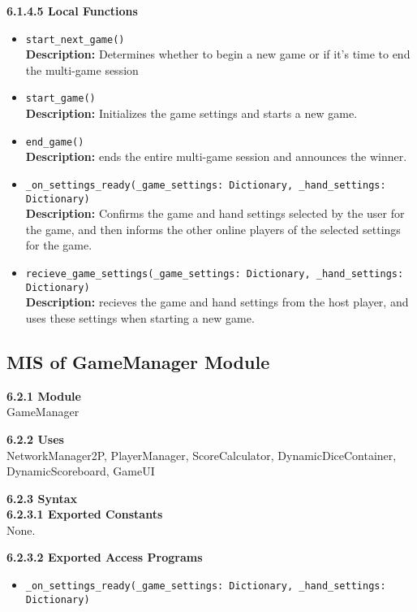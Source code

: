 \documentclass[12pt, titlepage]{article}
\begin{document}
\textbf{6.1.4.5 Local Functions}
\begin{itemize}
    \item \texttt{start\_next\_game()}\\
	\textbf{Description:} Determines whether to begin a new game or if it's time to end the multi-game session 
    
    \item \texttt{start\_game()}\\
    \textbf{Description:} Initializes the game settings and starts a new game.
    
    \item \texttt{end\_game()}\\
    \textbf{Description:} ends the entire multi-game session and announces the winner.
    
    \item \texttt{\_on\_settings\_ready(\_game\_settings: Dictionary, \_hand\_settings: Dictionary)}\\
    \textbf{Description:} Confirms the game and hand settings selected by the user for the game, and then informs the other online players of the selected settings for the game.
    
    \item \texttt{recieve\_game\_settings(\_game\_settings: Dictionary, \_hand\_settings: Dictionary)}\\
    \textbf{Description:} recieves the game and hand settings from the host player, and uses these settings when starting a new game.
    
\end{itemize}

\subsection{MIS of GameManager Module}
\textbf{6.2.1 Module}\\
GameManager

\textbf{6.2.2 Uses}\\
NetworkManager2P, PlayerManager, ScoreCalculator, DynamicDiceContainer, DynamicScoreboard, GameUI

\textbf{6.2.3 Syntax}\\
\textbf{6.2.3.1 Exported Constants}\\
None.  

\textbf{6.2.3.2 Exported Access Programs}
\begin{itemize}
    \item \texttt{\_on\_settings\_ready(\_game\_settings: Dictionary, \_hand\_settings: Dictionary)}
\end{itemize}
\end{document}
